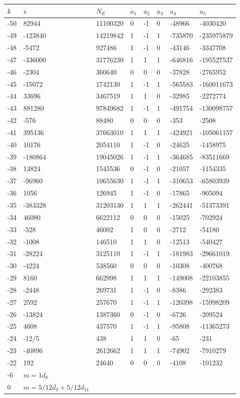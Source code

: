 \documentclass{amsart}
\begin{document}
\begin{longtable}{|l|l|l|lllll|}
\hline
$k$ & $s$ & $N_E$ & $a_1$ & $a_2$ & $a_3$ & $a_4$ & $a_5$\\
\hline
-50&82944&11100320&0&-1&0&-48966&-4030420\\
-49&-123840&14219842&1&-1&1&-735870&-235975879\\
-48&-5472&927486&1&-1&0&-43146&-3347708\\
-47&-336000&31776230&1&1&1&-646816&-195527537\\
-46&-2304&360640&0&0&0&-37828&-2765952\\
-45&-15072&1742130&1&-1&1&-565583&-160011673\\
-44&33696&3467519&1&1&0&-32985&-2272774\\
-43&881280&97849682&1&-1&1&-491754&-130098757\\
-42&-576&88480&0&0&0&-353&-2508\\
-41&395136&37663010&1&1&1&-424921&-105061157\\
-40&10176&2054110&1&-1&0&-24625&-1458975\\
-39&-180864&19045026&1&-1&1&-364685&-83511669\\
-38&13824&1545536&0&-1&0&-21057&-1154335\\
-37&-96960&10655630&1&-1&1&-310653&-65803939\\
-36&1056&126945&1&-1&0&-17865&-905094\\
-35&-383328&31203130&1&1&1&-262441&-51373391\\
-34&46080&6622112&0&0&0&-15025&-702924\\
-33&-528&46002&1&0&0&-2712&-54180\\
-32&-1008&146510&1&1&0&-12513&-540427\\
-31&-28224&3125110&1&-1&1&-181983&-29661019\\
-30&-4224&538560&0&0&0&-10308&-400768\\
-29&8160&662998&1&1&1&-149008&-22103855\\
-28&-2448&269731&1&-1&0&-8386&-292383\\
-27&2592&257670&1&-1&1&-120398&-15998209\\
-26&-13824&1387360&0&-1&0&-6726&-209524\\
-25&4608&437570&1&-1&1&-95808&-11365273\\
-24&-12/5&438&1&1&0&-65&-231\\
-23&-40896&2612662&1&1&1&-74902&-7910279\\
-22&192&24640&0&0&0&-4108&-101232\\
-6&$m=1d_{8}$&&\multicolumn{5}{c|}{}\\
0&$m=5/12d_{3}+5/12d_{11}$&&\multicolumn{5}{c|}{}\\
\hline
\end{longtable}
\end{document}
